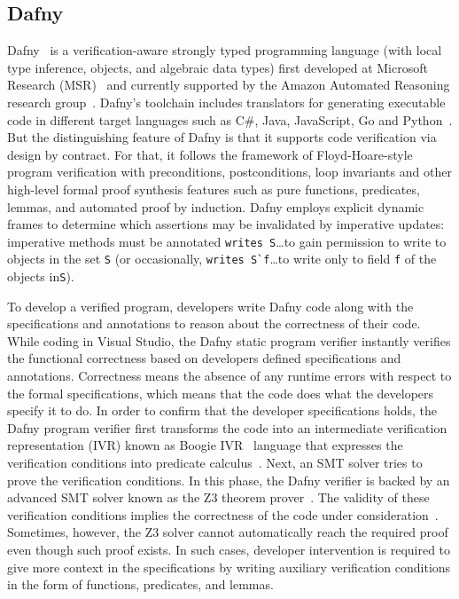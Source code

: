 
\subsection{Dafny}
Dafny~\cite{dafnytsite} is a verification-aware strongly typed programming language 
(with local type inference, objects, and algebraic data types)
first developed at Microsoft Research (MSR)~\cite{microsoftresearch} and  currently supported by the Amazon Automated Reasoning research group~\cite{awsautomatedreasoning}. Dafny's toolchain includes translators for generating executable code in different target languages such as C\#, Java, JavaScript, Go and Python~\cite{dafny-github}. But the distinguishing feature of Dafny is that it supports code verification via design by contract. For that, it follows the framework of Floyd-Hoare-style ~\cite{DBLP:journals/cacm/Hoare69} program verification with preconditions, postconditions, loop invariants and other high-level formal proof synthesis features such as pure functions, predicates, lemmas, and automated proof by induction. Dafny employs explicit dynamic frames to determine which assertions may be invalidated by imperative updates: imperative methods must be annotated \lstinline+writes S+\ldots to gain permission to write to objects in the set \lstinline+S+ (or occasionally, \lstinline+writes S`f+\ldots to write only to field \lstinline+f+ of the objects in\lstinline+S+).

To develop a verified program, developers write Dafny code along with the specifications and annotations to reason about the correctness of their code. While coding in Visual Studio, the Dafny static program verifier instantly verifies the functional correctness based on developers defined specifications and annotations. Correctness means the absence of any runtime errors with respect to the formal specifications, which means that the code does what the developers specify it to do. In order to confirm that the developer  specifications holds, the Dafny program verifier first transforms the code  into an intermediate verification representation (IVR) known as Boogie IVR~\cite{le2011boogie} language that expresses the verification conditions into predicate calculus~\cite{DBLP:journals/software/Leino17}. Next, an SMT solver tries to prove the verification conditions. In this phase, the Dafny verifier is backed by an advanced SMT solver known as the Z3 theorem prover~\cite{Z3-tacas2008}. The validity of these verification conditions implies the correctness of the code under consideration~\cite{DBLP:journals/software/Leino17}. Sometimes, however, the Z3 solver cannot automatically reach the required proof even though such proof exists. In such cases, developer intervention is required to give more context in the specifications by writing auxiliary verification conditions in the form of functions, predicates, and lemmas. 

